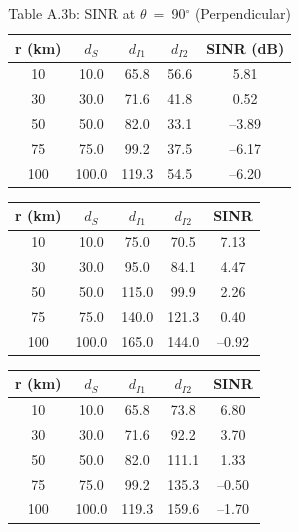\begin{table}[h!]
\centering
\footnotesize
\caption{Table A.3b: SINR at $\theta$~=~90$^\circ$ (Perpendicular)}
\label{table:app-sinr-90deg}
\begin{tabular}{|c|c|c|c|c|}
\hline
\textbf{r (km)} & \textbf{$d_S$} & \textbf{$d_{I1}$} & \textbf{$d_{I2}$} & \textbf{SINR (dB)} \\
\hline
10 & 10.0 & 65.8 & 56.6 & 5.81 \\
30 & 30.0 & 71.6 & 41.8 & 0.52 \\
50 & 50.0 & 82.0 & 33.1 & --3.89 \\
75 & 75.0 & 99.2 & 37.5 & --6.17 \\
100 & 100.0 & 119.3 & 54.5 & --6.20 \\
\hline
\end{tabular}
\end{table}

\noindent
\begin{minipage}[t]{0.48\textwidth}
\centering
\footnotesize
{}
\label{table:app-sinr-180deg}
\begin{tabular}{|c|c|c|c|c|}
\hline
\textbf{r (km)} & \textbf{$d_S$} & \textbf{$d_{I1}$} & \textbf{$d_{I2}$} & \textbf{SINR} \\
\hline
10 & 10.0 & 75.0 & 70.5 & 7.13 \\
30 & 30.0 & 95.0 & 84.1 & 4.47 \\
50 & 50.0 & 115.0 & 99.9 & 2.26 \\
75 & 75.0 & 140.0 & 121.3 & 0.40 \\
100 & 100.0 & 165.0 & 144.0 & --0.92 \\
\hline
\end{tabular}
\end{minipage}
\hfill
\begin{minipage}[t]{0.48\textwidth}
\centering
\footnotesize
{}
\label{table:app-sinr-270deg}
\begin{tabular}{|c|c|c|c|c|}
\hline
\textbf{r (km)} & \textbf{$d_S$} & \textbf{$d_{I1}$} & \textbf{$d_{I2}$} & \textbf{SINR} \\
\hline
10 & 10.0 & 65.8 & 73.8 & 6.80 \\
30 & 30.0 & 71.6 & 92.2 & 3.70 \\
50 & 50.0 & 82.0 & 111.1 & 1.33 \\
75 & 75.0 & 99.2 & 135.3 & --0.50 \\
100 & 100.0 & 119.3 & 159.6 & --1.70 \\
\hline
\end{tabular}
\end{minipage}
